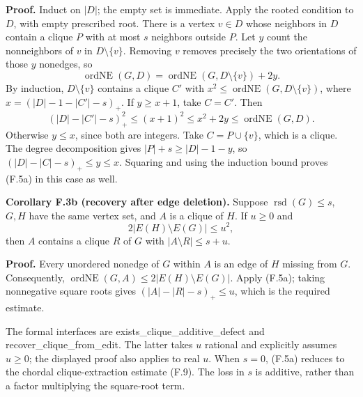 \documentclass[english,11pt,a4paper]{article}
\newcounter{none}
\begin{document}
\textbf{Proof.} Induct on \(|D|\); the empty set is immediate. Apply the rooted condition to \(D\), with empty prescribed root. There is a vertex \(v\in D\) whose neighbors in \(D\) contain a clique \(P\) with at most \(s\) neighbors outside \(P\). Let \(y\) count the nonneighbors of \(v\) in \(D\setminus\{v\}\). Removing \(v\) removes precisely the two orientations of those \(y\) nonedges, so \[
\operatorname{ordNE}(G,D)
=\operatorname{ordNE}(G,D\setminus\{v\})+2y.
\] By induction, \(D\setminus\{v\}\) contains a clique \(C'\) with \(x^2\le\operatorname{ordNE}(G,D\setminus\{v\})\), where \(x=(|D|-1-|C'|-s)_+\). If \(y\ge x+1\), take \(C=C'\). Then \[
(|D|-|C'|-s)_+^2\le(x+1)^2
\le x^2+2y\le\operatorname{ordNE}(G,D).
\] Otherwise \(y\le x\), since both are integers. Take \(C=P\cup\{v\}\), which is a clique. The degree decomposition gives \(|P|+s\ge |D|-1-y\), so \((|D|-|C|-s)_+\le y\le x\). Squaring and using the induction bound proves (F.5a) in this case as well.

\textbf{Corollary F.3b (recovery after edge deletion).} Suppose \(\operatorname{rsd}(G)\le s\), \(G,H\) have the same vertex set, and \(A\) is a clique of \(H\). If \(u\ge0\) and \[
2|E(H)\setminus E(G)|\le u^2,
\] then \(A\) contains a clique \(R\) of \(G\) with \(|A\setminus R|\le s+u\).

\textbf{Proof.} Every unordered nonedge of \(G\) within \(A\) is an edge of \(H\) missing from \(G\). Consequently, \(\operatorname{ordNE}(G,A)\le2|E(H)\setminus E(G)|\). Apply (F.5a); taking nonnegative square roots gives \((|A|-|R|-s)_+\le u\), which is the required estimate.

The formal interfaces are {\ttfamily\small exists\_\discretionary{\hbox{\ensuremath{\hookrightarrow}}}{}{}clique\_\discretionary{\hbox{\ensuremath{\hookrightarrow}}}{}{}additive\_\discretionary{\hbox{\ensuremath{\hookrightarrow}}}{}{}defect} and {\ttfamily\small recover\_\discretionary{\hbox{\ensuremath{\hookrightarrow}}}{}{}clique\_\discretionary{\hbox{\ensuremath{\hookrightarrow}}}{}{}from\_\discretionary{\hbox{\ensuremath{\hookrightarrow}}}{}{}edit}. The latter takes \(u\) rational and explicitly assumes \(u\ge0\); the displayed proof also applies to real \(u\). When \(s=0\), (F.5a) reduces to the chordal clique-extraction estimate (F.9). The loss in \(s\) is additive, rather than a factor multiplying the square-root term.
\end{document}
